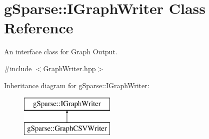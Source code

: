 \hypertarget{classg_sparse_1_1_i_graph_writer}{}\section{g\+Sparse\+:\+:I\+Graph\+Writer Class Reference}
\label{classg_sparse_1_1_i_graph_writer}


An interface class for Graph Output.  




{\ttfamily \#include $<$Graph\+Writer.\+hpp$>$}

Inheritance diagram for g\+Sparse\+:\+:I\+Graph\+Writer\+:\begin{figure}[H]
\begin{center}
\leavevmode
\includegraphics[height=2.000000cm]{classg_sparse_1_1_i_graph_writer}
\end{center}
\end{figure}

